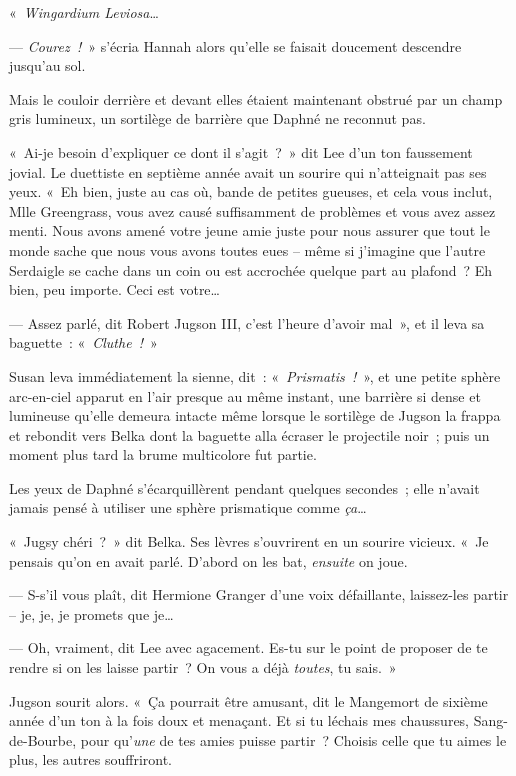 «~\emph{Wingardium Leviosa}…

--- \emph{Courez~!}~» s'écria Hannah alors qu'elle se faisait doucement descendre jusqu'au sol.

Mais le couloir derrière et devant elles étaient maintenant obstrué par un champ gris lumineux, un sortilège de barrière que Daphné ne reconnut pas.

«~Ai-je besoin d'expliquer ce dont il s'agit~?~»
dit Lee d'un ton faussement jovial.
Le duettiste en septième année avait un sourire qui n'atteignait pas ses yeux.
«~Eh bien, juste au cas où, bande de petites gueuses, et cela vous inclut, Mlle Greengrass, vous avez causé suffisamment de problèmes et vous avez assez menti.
Nous avons amené votre jeune amie juste pour nous assurer que tout le monde sache que nous vous avons toutes eues -- même si j'imagine que l'autre Serdaigle se cache dans un coin ou est accrochée quelque part au plafond~?
Eh bien, peu importe.
Ceci est votre…

--- Assez parlé, dit Robert Jugson III, c'est l'heure d'avoir mal~», et il leva sa baguette~: «~\emph{Cluthe~!}~»

Susan leva immédiatement la sienne, dit~: «~\emph{Prismatis~!}~», et une petite sphère arc-en-ciel apparut en l'air presque au même instant, une barrière si dense et lumineuse qu'elle demeura intacte même lorsque le sortilège de Jugson la frappa et rebondit vers Belka dont la baguette alla écraser le projectile noir~; puis un moment plus tard la brume multicolore fut partie.

Les yeux de Daphné s'écarquillèrent pendant quelques secondes~; elle n'avait jamais pensé à utiliser une sphère prismatique comme \emph{ça}…

«~Jugsy chéri~?~»
dit Belka.
Ses lèvres s'ouvrirent en un sourire vicieux.
«~Je pensais qu'on en avait parlé.
D'abord on les bat, \emph{ensuite} on joue.

--- S-s'il vous plaît, dit Hermione Granger d'une voix défaillante, laissez-les partir -- je, je, je promets que je…

--- Oh, vraiment, dit Lee avec agacement.
Es-tu sur le point de proposer de te rendre si on les laisse partir~?
On vous a déjà \emph{toutes}, tu sais.~»

Jugson sourit alors.
«~Ça pourrait être amusant, dit le Mangemort de sixième année d'un ton à la fois doux et menaçant.
Et si tu léchais mes chaussures, Sang-de-Bourbe, pour qu'\emph{une} de tes amies puisse partir~?
Choisis celle que tu aimes le plus, les autres souffriront.

